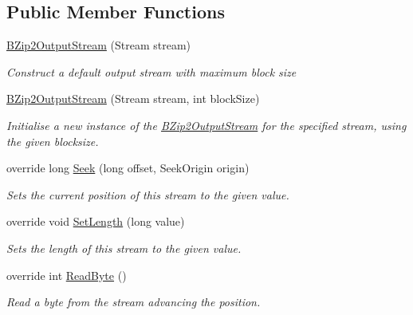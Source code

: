 \subsection*{Public Member Functions}
\begin{DoxyCompactItemize}
\item 
\hyperlink{class_i_c_sharp_code_1_1_sharp_zip_lib_1_1_b_zip2_1_1_b_zip2_output_stream_a3202cc0c622849235c0363339c0943a6}{B\+Zip2\+Output\+Stream} (Stream stream)
\begin{DoxyCompactList}\small\item\em Construct a default output stream with maximum block size \end{DoxyCompactList}\item 
\hyperlink{class_i_c_sharp_code_1_1_sharp_zip_lib_1_1_b_zip2_1_1_b_zip2_output_stream_aa9034eb682b617126197ba4fa4280473}{B\+Zip2\+Output\+Stream} (Stream stream, int block\+Size)
\begin{DoxyCompactList}\small\item\em Initialise a new instance of the \hyperlink{class_i_c_sharp_code_1_1_sharp_zip_lib_1_1_b_zip2_1_1_b_zip2_output_stream}{B\+Zip2\+Output\+Stream} for the specified stream, using the given blocksize. \end{DoxyCompactList}\item 
override long \hyperlink{class_i_c_sharp_code_1_1_sharp_zip_lib_1_1_b_zip2_1_1_b_zip2_output_stream_ab7c5abe091218dfa26c08b331275692f}{Seek} (long offset, Seek\+Origin origin)
\begin{DoxyCompactList}\small\item\em Sets the current position of this stream to the given value. \end{DoxyCompactList}\item 
override void \hyperlink{class_i_c_sharp_code_1_1_sharp_zip_lib_1_1_b_zip2_1_1_b_zip2_output_stream_af52c0298da775bd9836e2f660ee2dab6}{Set\+Length} (long value)
\begin{DoxyCompactList}\small\item\em Sets the length of this stream to the given value. \end{DoxyCompactList}\item 
override int \hyperlink{class_i_c_sharp_code_1_1_sharp_zip_lib_1_1_b_zip2_1_1_b_zip2_output_stream_a0111157db0edadeb5fffcf38e1eba17b}{Read\+Byte} ()
\begin{DoxyCompactList}\small\item\em Read a byte from the stream advancing the position. \end{DoxyCompactList}\item 

\end{DoxyCompactItemize}
